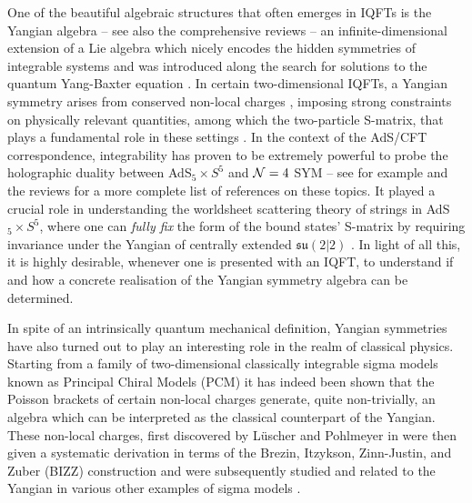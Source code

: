 \documentclass[12pt]{article}
\numberwithin{equation}{section}
\begin{document}
One of the beautiful algebraic structures that often emerges in IQFTs is the Yangian algebra \cite{Drinfeld:1985rx,Drinfeld:1986in,Drinfeld:1987sy} -- see also the comprehensive reviews \cite{Loebbert:2016cdm,MacKay:2004tc,Torrielli:2010kq,Torrielli:2011gg,Bernard:1992ya} -- an infinite-dimensional extension of a Lie algebra which nicely encodes the hidden symmetries of integrable systems and was introduced along the search for solutions to the quantum Yang-Baxter equation \cite{Yang:1967bm,Yang:1968rm,Baxter:1972hz}. In certain two-dimensional IQFTs, a Yangian symmetry arises from conserved non-local charges \cite{Luscher:1977uq,deVega:1984wk,deVega:1983ogx,Bernard:1990jw}, imposing strong constraints on physically relevant quantities, among which the two-particle S-matrix, that plays a fundamental role in these settings \cite{Zamolodchikov:1978xm,Dorey:1996gd,Bombardelli:2016scq}. In the context of the AdS/CFT correspondence, integrability has proven to be extremely powerful to probe the holographic duality between AdS$_5\times S^5$ and ${\cal N}=4$ SYM -- see for example \cite{Metsaev:1998it,Minahan:2002ve,Frolov:2003qc,Bena:2003wd,Dolan:2003uh,Dolan:2004ps,Dolan:2004ys,Kazakov:2004qf,Beisert:2005fw,Beisert:2005tm,Drummond:2008vq,Drummond:2009fd} and the reviews \cite{Arutyunov:2009ga,Beisert:2010jr,Bombardelli:2016rwb,Demulder:2023bux} for a more complete list of references on these topics. It played a crucial role in understanding the worldsheet scattering theory of strings in AdS$_5\times S^5$, where one can \textit{fully fix} the form of the bound states' S-matrix by requiring invariance under the Yangian of centrally extended $\mathfrak {su}(2|2)$ \cite{Beisert:2007ds,deLeeuw:2008dp, Arutyunov:2009mi}. In light of all this, it is highly desirable, whenever one is presented with an IQFT, to understand if and how a concrete realisation of the Yangian symmetry algebra can be determined. 


In spite of an intrinsically quantum mechanical definition, Yangian symmetries have also turned out to play an interesting role in the realm of classical physics. Starting from a family of two-dimensional classically integrable sigma models known as Principal Chiral Models (PCM) it has indeed been shown \cite{MacKay:1992he} that the Poisson brackets of certain non-local charges generate, quite non-trivially, an algebra which can be interpreted as the classical counterpart of the Yangian. These non-local charges, first discovered by L{\"u}scher and Pohlmeyer in \cite{Luscher:1977rq} were then given a systematic derivation in terms of the Brezin, Itzykson, Zinn-Justin, and Zuber (BIZZ) construction \cite{BREZIN1979442} and were subsequently studied and related to the Yangian in various other examples of sigma models \cite{Abdalla:1993sc,Saltini:1995xr,Hatsuda:2004it,Kawaguchi:2010jg,Kawaguchi:2011mz,Kawaguchi:2012ve,Itsios:2014vfa,Klose:2016qfv}. 
\end{document}
